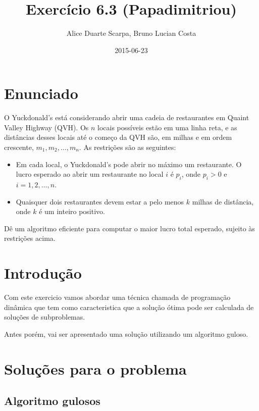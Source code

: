 \documentclass[11pt]{article}
\author{Alice Duarte Scarpa, Bruno Lucian Costa}
\date{2015-06-23}
\title{Exercício 6.3 (Papadimitriou)}
\begin{document}
\maketitle

\section{Enunciado}
\label{sec-1}

O Yuckdonald's está considerando abrir uma cadeia de restaurantes em
Quaint Valley Highway (QVH). Os $n$ locais possíveis estão em uma
linha reta, e as distâncias desses locais até o começo da QVH são, em
milhas e em ordem crescente, $m_1, m_2, \ldots, m_n$. As restrições
são as seguintes:
\\

\noindent
\begin{itemize}


\item Em cada local, o Yuckdonald's pode abrir no máximo um restaurante. O lucro esperado ao abrir um restaurante no local 
$i$ é $p_i$, onde $p_i > 0$ e $i = 1, 2, \ldots, n$.
\item Quaisquer dois restaurantes devem estar a pelo menos $k$ milhas de distância, onde $k$ é um inteiro positivo.

\end{itemize}

Dê um algoritmo eficiente para computar o maior lucro total
esperado, sujeito às restrições acima.



\section{Introdução}
\label{sec-2}

Com este exercicio vamos abordar uma técnica chamada de programação dinâmica que tem como caracteristica que 
a solução ótima pode ser calculada de soluções de subproblemas.

Antes porém, vai ser apresentado uma solução utilizando um algoritmo guloso. 


\section{Soluções para o problema}
\label{sec-3}

\subsection{Algoritmo gulosos}
\end{document}
